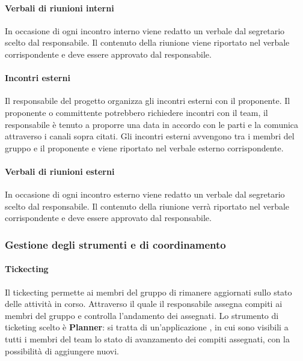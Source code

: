 \paragraph{Verbali di riunioni interni} 
In occasione di ogni incontro interno viene redatto un verbale dal segretario scelto dal responsabile. Il contenuto della riunione viene riportato nel verbale corrispondente e deve essere approvato dal responsabile.

\paragraph{Incontri esterni} 
Il responsabile del progetto organizza gli incontri esterni con il proponente. Il proponente o committente potrebbero richiedere incontri con il team, il responsabile è tenuto a proporre una data in accordo con le parti e la comunica attraverso i canali sopra citati.
Gli incontri esterni avvengono tra i membri del gruppo e il proponente e viene riportato nel verbale esterno corrispondente.

\paragraph{Verbali di riunioni esterni} 
In occasione di ogni incontro esterno viene redatto un verbale dal segretario scelto dal responsabile. Il contenuto della riunione verrà riportato nel verbale corrispondente e deve essere approvato dal responsabile.

\subsubsection{Gestione degli strumenti e di coordinamento}
\paragraph{Tickecting}

Il tickecting permette ai  membri del gruppo di rimanere aggiornati sullo stato delle attività in corso. Attraverso il quale il responsabile assegna compiti ai membri del gruppo e controlla l'andamento dei  assegnati. Lo strumento di ticketing scelto è \textbf{Planner}: si tratta di un'applicazione , in cui sono visibili a tutti i membri del team lo stato di avanzamento dei compiti assegnati, con la possibilità di aggiungere nuovi. 

